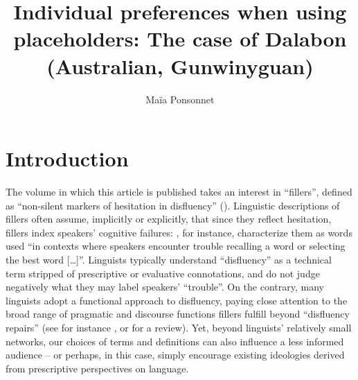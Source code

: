 \documentclass[output=paper]{langscibook}
\author{Maïa Ponsonnet\orcid{0000-0002-8879-9798}\affiliation{Laboratoire Dynamique du Langage (CNRS \& Université Lumière Lyon 2) ; University of Western Australia}}
\title[Individual preferences when using placeholders]{Individual preferences when using placeholders: The case of Dalabon (Australian, Gunwinyguan)}
\begin{document}
\maketitle 


\section{Introduction}
\label{sec:ponsonnet:1}
The volume in which this article is published takes an interest in “fillers”, defined as “non-silent markers of hesitation in disfluency” (\citealt{chapters/intro}). Linguistic descriptions of fillers often assume, implicitly or explicitly, that since they reflect hesitation, fillers index speakers’ cognitive failures: \citet[485]{HayashiHayashi2006}, for instance, characterize them as words used “in contexts where speakers encounter trouble recalling a word or selecting the best word […]”. Linguists typically understand “disfluency” as a technical term stripped of prescriptive or evaluative connotations, and do not judge negatively what they may label speakers’ “trouble”. On the contrary, many linguists adopt a functional approach to disfluency, paying close attention to the broad range of pragmatic and discourse functions fillers fulfill beyond “disfluency repairs” (see for instance \citet{Keevallik2010}, or \citet{KosmalaCrible2022} for a review). Yet, beyond linguists’ relatively small networks, our choices of terms and definitions can also influence a less informed audience – or perhaps, in this case, simply encourage existing ideologies derived from prescriptive perspectives on language. 
\end{document}
